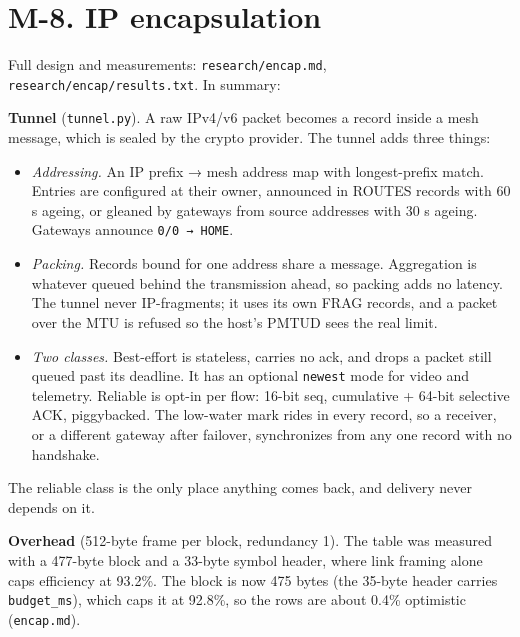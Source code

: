 \documentclass[10pt,letterpaper,twocolumn]{article}
\providecommand{\tightlist}{\setlength{\itemsep}{0pt}\setlength{\parskip}{0pt}}
\begin{document}
\section{M-8. IP encapsulation}\label{m-8-ip-encapsulation}

Full design and measurements: \texttt{research/\allowbreak{}encap.\allowbreak{}md}, \texttt{research/\allowbreak{}encap/\allowbreak{}results.\allowbreak{}txt}. In summary:

\textbf{Tunnel} (\texttt{tunnel.\allowbreak{}py}). A raw IPv4/v6 packet becomes a record inside a mesh message, which is sealed by the crypto provider. The tunnel adds three things:

\begin{itemize}
\tightlist
\item
  \emph{Addressing.} An IP prefix → mesh address map with longest-prefix match. Entries are configured at their owner, announced in ROUTES records with 60 s ageing, or gleaned by gateways from source addresses with 30 s ageing. Gateways announce \texttt{0/\allowbreak{}0\ →\ HOME}.
\item
  \emph{Packing.} Records bound for one address share a message. Aggregation is whatever queued behind the transmission ahead, so packing adds no latency. The tunnel never IP-fragments; it uses its own FRAG records, and a packet over the MTU is refused so the host's PMTUD sees the real limit.
\item
  \emph{Two classes.} Best-effort is stateless, carries no ack, and drops a packet still queued past its deadline. It has an optional \texttt{newest} mode for video and telemetry. Reliable is opt-in per flow: 16-bit seq, cumulative + 64-bit selective ACK, piggybacked. The low-water mark rides in every record, so a receiver, or a different gateway after failover, synchronizes from any one record with no handshake.
\end{itemize}

The reliable class is the only place anything comes back, and delivery never depends on it.

\textbf{Overhead} (512-byte frame per block, redundancy 1). The table was measured with a 477-byte block and a 33-byte symbol header, where link framing alone caps efficiency at 93.2\%. The block is now 475 bytes (the 35-byte header carries \texttt{budget\_\allowbreak{}ms}), which caps it at 92.8\%, so the rows are about 0.4\% optimistic (\texttt{encap.\allowbreak{}md}).

\end{document}
